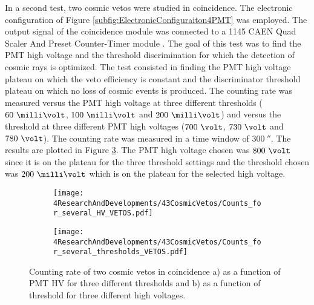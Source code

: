 In a second test, two cosmic vetos were studied in coincidence. The electronic configuration of Figure \ref{subfig:ElectronicConfiguraiton4PMT} was employed. The output signal of the coincidence module was connected to a 1145 CAEN Quad Scaler And Preset Counter-Timer module \cite{ScalerDataSheet}. The goal of this test was to find the PMT high voltage and the threshold discrimination for which the detection of cosmic rays is optimized. The test consisted in finding the PMT high voltage plateau on which the veto efficiency is constant and the discriminator threshold plateau on which no loss of cosmic events is produced. The counting rate was measured versus the PMT high voltage at three different thresholds ($60~\milli\volt$, $100~\milli\volt$ and $200~\milli\volt$) and versus the threshold at three different PMT high voltages ($700~\volt$, $730~\volt$ and $780~\volt$). The counting rate was measured in a time window of $300~\second$. The results are plotted in Figure \ref{fig:HVandThresholdsPLateaus}. The PMT high voltage chosen was $800~\volt$ since it is on the plateau for the three threshold settings and the threshold chosen was $200~\milli\volt$ which is on the plateau for the selected high voltage. 

\begin{figure}
\centering
    \begin{subfigure}[b]{0.8\textwidth}
    \centering
    \texttt{[image: 4ResearchAndDevelopments/43CosmicVetos/Counts\_for\_several\_HV\_VETOS.pdf]}  
    \caption{\label{subfig:HVPLateauVetos}}
    \end{subfigure}
    \hfill
    \begin{subfigure}[b]{0.8\textwidth}
    \centering
    \texttt{[image: 4ResearchAndDevelopments/43CosmicVetos/Counts\_for\_several\_thresholds\_VETOS.pdf]}  
    \caption{\label{subfig:ThresholdsPlateau}}
    \end{subfigure}
 \caption{Counting rate of two cosmic vetos in coincidence a) as a function of PMT HV for three different thresholds and b) as a function of threshold for three different high voltages.}
 \label{fig:HVandThresholdsPLateaus}
\end{figure}

